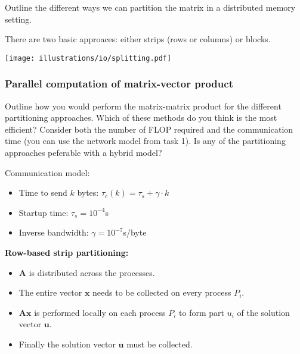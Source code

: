 \begin{question}
  Outline the different ways we can partition the matrix in a distributed memory setting.
\end{question}

\noindent There are two basic approaces: either strips (rows or columns) or blocks.

\begin{center}
  \texttt{[image: illustrations/io/splitting.pdf]}
\end{center}


\subsubsection{Parallel computation of matrix-vector product} %
\label{ssub:parallel_computation_of_matrix_vector_product}


\begin{question}
  Outline how you would perform the matrix-matrix product for the different partitioning approaches. Which of these methods do you think is the most efficient? Consider both the number of FLOP required and the communication time (you can use the network model from task 1). Is any of the partitioning approaches peferable with a hybrid model?

  \noindent Communication model:
  \begin{itemize} \itemsep=0em
    \item Time to send $k$ bytes: $\tau_c(k) = \tau_s + \gamma \cdot k$
    \item Startup time: $\tau_s = 10^{-4}$s
    \item Inverse bandwidth: $\gamma = 10^{-7}$s/byte
  \end{itemize}

\end{question}


\noindent\textbf{Row-based strip partitioning:}

\begin{itemize}
  \item $\mathbf{A}$ is distributed across the processes.
  \item The entire vector $\mathbf{x}$ needs to be collected on every process $P_i$.
  \item $\mathbf{Ax}$ is performed locally on each process $P_i$ to form part $u_i$ of the solution vector $\mathbf{u}$.
  \item Finally the solution vector $\mathbf{u}$ must be collected.
\end{itemize}

